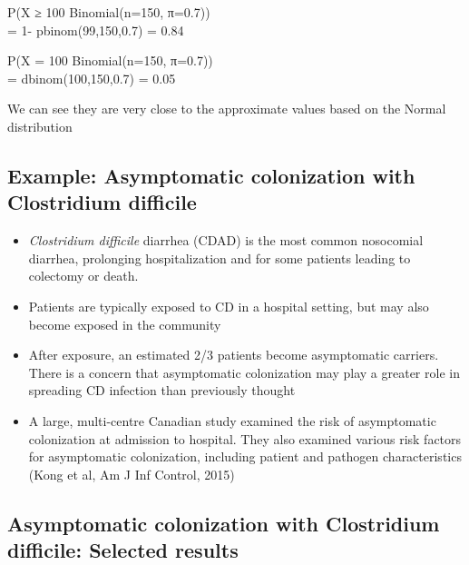 \documentclass[
]{book}
\providecommand{\tightlist}{%
  \setlength{\itemsep}{0pt}\setlength{\parskip}{0pt}}
\begin{document}
P(X ≥ 100 \textbar{} Binomial(n=150, π=0.7))\\
= 1- pbinom(99,150,0.7) = 0.84

P(X = 100 \textbar{} Binomial(n=150, π=0.7))\\
= dbinom(100,150,0.7) = 0.05

We can see they are very close to the approximate values based on the Normal distribution

\hypertarget{example-asymptomatic-colonization-with-clostridium-difficile}{%
\subsection{Example: Asymptomatic colonization with Clostridium difficile}\label{example-asymptomatic-colonization-with-clostridium-difficile}}

\begin{itemize}
\tightlist
\item
  \emph{Clostridium difficile} diarrhea (CDAD) is the most common nosocomial diarrhea, prolonging hospitalization and for some patients leading to colectomy or death.
\item
  Patients are typically exposed to CD in a hospital setting, but may also become exposed in the community
\item
  After exposure, an estimated 2/3 patients become asymptomatic carriers. There is a concern that asymptomatic colonization may play a greater role in spreading CD infection than previously thought
\item
  A large, multi-centre Canadian study examined the risk of asymptomatic colonization at admission to hospital. They also examined various risk factors for asymptomatic colonization, including patient and pathogen characteristics (Kong et al, Am J Inf Control, 2015)
\end{itemize}

\hypertarget{asymptomatic-colonization-with-clostridium-difficile-selected-results}{%
\subsection{Asymptomatic colonization with Clostridium difficile: Selected results}\label{asymptomatic-colonization-with-clostridium-difficile-selected-results}}
\end{document}
